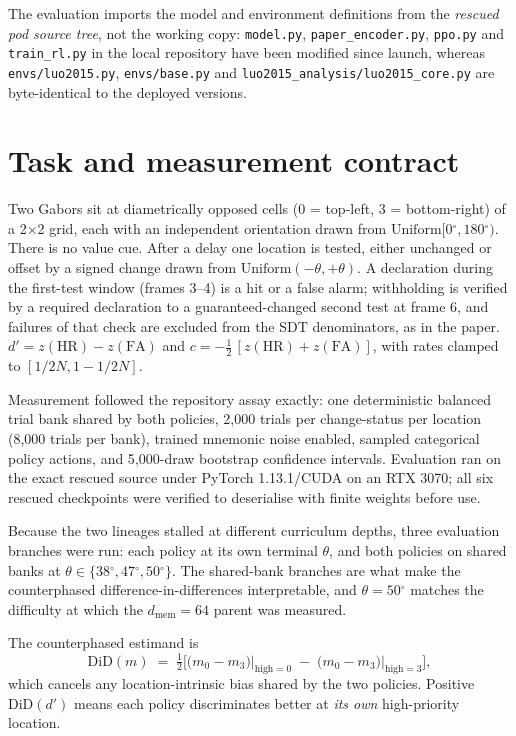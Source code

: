 \documentclass[11pt]{article}
\newcommand{\dprime}{d'}
\newcommand{\dg}{\ensuremath{^\circ}}
\begin{document}
The evaluation imports the model and environment definitions from the \emph{rescued pod
source tree}, not the working copy: \texttt{model.py}, \texttt{paper\_encoder.py},
\texttt{ppo.py} and \texttt{train\_rl.py} in the local repository have been modified since
launch, whereas \texttt{envs/luo2015.py}, \texttt{envs/base.py} and
\texttt{luo2015\_analysis/luo2015\_core.py} are byte-identical to the deployed versions.

\section{Task and measurement contract}

Two Gabors sit at diametrically opposed cells (0 = top-left, 3 = bottom-right) of a
2$\times$2 grid, each with an independent orientation drawn from
$\mathrm{Uniform}[0\dg,180\dg)$. There is no value cue. After a delay one location is
tested, either unchanged or offset by a signed change drawn from
$\mathrm{Uniform}(-\theta,+\theta)$. A declaration during the first-test window
(frames 3--4) is a hit or a false alarm; withholding is verified by a required
declaration to a guaranteed-changed second test at frame 6, and failures of that check
are excluded from the SDT denominators, as in the paper. $\dprime = z(\mathrm{HR}) -
z(\mathrm{FA})$ and $c = -\tfrac{1}{2}\,[z(\mathrm{HR}) + z(\mathrm{FA})]$, with rates
clamped to $[1/2N, 1-1/2N]$.

Measurement followed the repository assay exactly: one deterministic balanced trial bank
shared by both policies, 2{,}000 trials per change-status per location (8{,}000 trials per
bank), trained mnemonic noise enabled, sampled categorical policy actions, and
5{,}000-draw bootstrap confidence intervals. Evaluation ran on the exact rescued source
under PyTorch 1.13.1/CUDA on an RTX 3070; all six rescued checkpoints were verified to
deserialise with finite weights before use.

Because the two lineages stalled at different curriculum depths, three evaluation
branches were run: each policy at its own terminal $\theta$, and both policies on shared
banks at $\theta \in \{38\dg, 47\dg, 50\dg\}$. The shared-bank branches are what make
the counterphased difference-in-differences interpretable, and $\theta = 50\dg$ matches
the difficulty at which the $d_{\mathrm{mem}}{=}64$ parent was measured.

The counterphased estimand is
\begin{equation}
\mathrm{DiD}(m) \;=\; \tfrac{1}{2}\Big[\big(m_0 - m_3\big)\big|_{\text{high}=0}
\;-\; \big(m_0 - m_3\big)\big|_{\text{high}=3}\Big],
\label{eq:did}
\end{equation}
which cancels any location-intrinsic bias shared by the two policies. Positive
$\mathrm{DiD}(\dprime)$ means each policy discriminates better at \emph{its own}
high-priority location.
\end{document}
